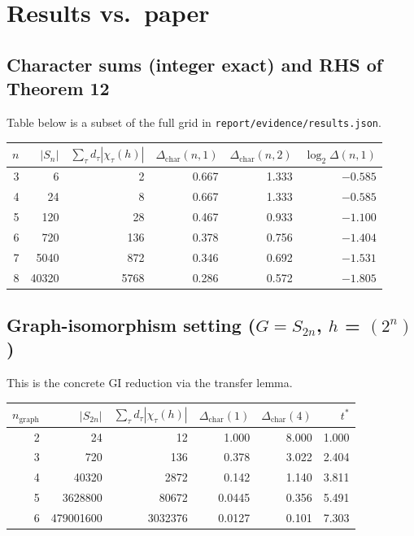 \documentclass[11pt]{article}
\begin{document}
\section{Results vs.\ paper}
\label{sec:results}

\subsection{Character sums (integer exact) and RHS of Theorem 12}
Table below is a subset of the full grid in
\texttt{report/evidence/results.json}.

\begin{center}
\begin{tabular}{@{}rrrrrr@{}}
\toprule
$n$ & $|S_n|$ & $\sum_\tau d_\tau|\chi_\tau(h)|$ & $\Delta_{\text{char}}(n,1)$ &
$\Delta_{\text{char}}(n,2)$ & $\log_2 \Delta(n,1)$ \\
\midrule
3 &     6 &     2 & 0.667 & 1.333 & $-0.585$ \\
4 &    24 &     8 & 0.667 & 1.333 & $-0.585$ \\
5 &   120 &    28 & 0.467 & 0.933 & $-1.100$ \\
6 &   720 &   136 & 0.378 & 0.756 & $-1.404$ \\
7 &  5040 &   872 & 0.346 & 0.692 & $-1.531$ \\
8 & 40320 &  5768 & 0.286 & 0.572 & $-1.805$ \\
\bottomrule
\end{tabular}
\end{center}

\subsection{Graph-isomorphism setting ($G = S_{2n}$, $h$ = $(2^n)$)}
This is the concrete GI reduction via the transfer lemma.

\begin{center}
\begin{tabular}{@{}rrrrrr@{}}
\toprule
$n_{\text{graph}}$ & $|S_{2n}|$ & $\sum_\tau d_\tau|\chi_\tau(h)|$ &
$\Delta_{\text{char}}(1)$ & $\Delta_{\text{char}}(4)$ & $t^*$ \\
\midrule
2 &        24 &       12 & 1.000  & 8.000   & 1.000 \\
3 &       720 &      136 & 0.378  & 3.022   & 2.404 \\
4 &     40320 &     2872 & 0.142  & 1.140   & 3.811 \\
5 &   3628800 &    80672 & 0.0445 & 0.356   & 5.491 \\
6 & 479001600 &  3032376 & 0.0127 & 0.101   & 7.303 \\
\bottomrule
\end{tabular}
\end{center}
\end{document}
